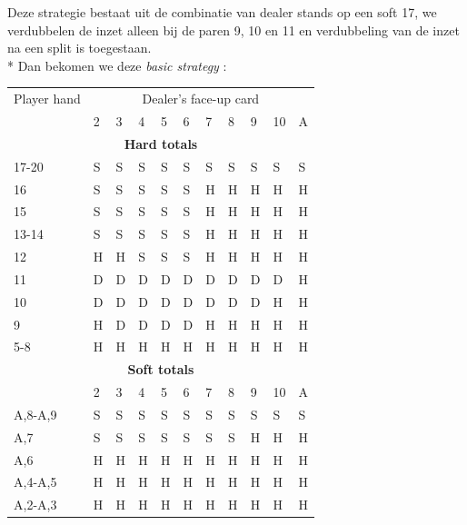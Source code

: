 \documentclass[conference]{IEEEtran}
\begin{document}
Deze strategie bestaat uit de combinatie van dealer stands op een soft 17, we verdubbelen de inzet alleen bij de paren 9, 10 en 11 en verdubbeling van de inzet na een split is toegestaan.\\*
Dan bekomen we deze \textit{basic strategy} :

\begin{table}[ht]
\tiny
\centering
\begin{tabular}{|l|l|l|l|l|l|l|l|l|l|l|}
\hline

{Player hand} & \multicolumn{10}{c|}{Dealer's face-up card}     \\ \cline{2-11} 
                             & 2 & 3 & 4 & 5 & 6 & 7 & 8 & 9 & 10 & A \\ \hline
\multicolumn{11}{|c|}{\textbf{Hard totals}}                           \\ \hline
17-20       								 & S & S & S & S & S & S & S & S & S & S  \\ \hline
16                           & S & S & S & S & S & H & H & H & H & H  \\ \hline
15                           & S & S & S & S & S & H & H & H & H & H  \\ \hline
13-14                        & S & S & S & S & S & H & H & H & H & H  \\ \hline
12                           & H & H & S & S & S & H & H & H & H & H  \\ \hline
11                           & D & D & D & D & D & D & D & D & D & H  \\ \hline
10                           & D & D & D & D & D & D & D & D & H & H  \\ \hline
9                            & H & D & D & D & D & H & H & H & H & H  \\ \hline
5-8                          & H & H & H & H & H & H & H & H & H & H  \\ \hline

\multicolumn{11}{|c|}{\textbf{Soft totals}}                           \\ \hline
                             & 2 & 3 & 4 & 5 & 6 & 7 & 8 & 9 & 10 & A \\ \hline
A,8-A,9                      & S & S & S & S & S & S & S & S & S & S  \\ \hline
A,7                          & S & S & S & S & S & S & S & H & H & H  \\ \hline
A,6                          & H & H & H & H & H & H & H & H & H & H  \\ \hline
A,4-A,5                      & H & H & H & H & H & H & H & H & H & H  \\ \hline
A,2-A,3                      & H & H & H & H & H & H & H & H & H & H  \\ \hline


\end{tabular}
\end{table}
\end{document}
